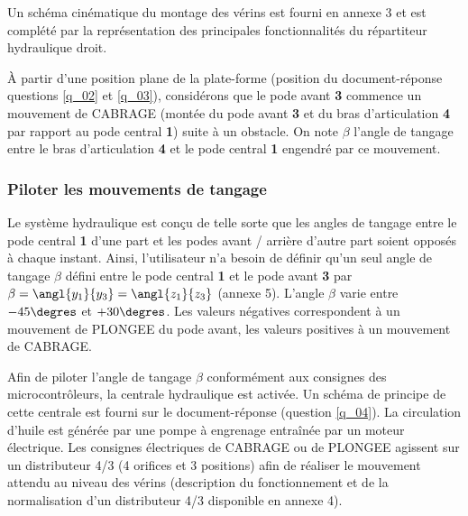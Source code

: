 Un schéma cinématique du montage des vérins est fourni en annexe 3 et est complété par la représentation des
principales fonctionnalités du répartiteur hydraulique droit.


\ifprof
\begin{corrige}
\end{corrige}
\else
\fi


À partir d’une position plane de la plate-forme (position du document-réponse questions \ref{q_02} et \ref{q_03}), considérons que le pode avant \textbf{3} commence un mouvement de CABRAGE (montée du pode avant \textbf{3} et du bras d’articulation \textbf{4} par rapport au pode central \textbf{1}) suite à un obstacle. On note $\beta$ l’angle de tangage entre le bras d’articulation \textbf{4} et le pode central \textbf{1} engendré par ce mouvement.

\ifprof
\begin{corrige}
\end{corrige}
\else
\fi


\subsubsection{Piloter les mouvements de tangage}
Le système hydraulique est conçu de telle sorte que les angles de tangage entre le pode central \textbf{1} d’une part et les
podes avant / arrière d’autre part soient opposés à chaque instant. Ainsi, l’utilisateur n’a besoin de définir qu’un seul
angle de tangage $\beta$ défini entre le pode central \textbf{1} et le pode avant \textbf{3} par $\beta=\angl{y_1}{y_3}=\angl{z_1}{z_3}$ (annexe 5). L’angle
$\beta$
varie entre $- 45\degres$ et $+30\degres$. Les valeurs négatives correspondent à un mouvement de PLONGEE du pode avant, les
valeurs positives à un mouvement de CABRAGE.

Afin de piloter l’angle de tangage $\beta$ conformément aux consignes des microcontrôleurs, la centrale hydraulique est activée. Un schéma de principe de cette centrale est fourni sur le document-réponse (question \ref{q_04}). La circulation d’huile est générée par une pompe à engrenage entraînée par un moteur électrique. Les consignes électriques de CABRAGE ou de PLONGEE agissent sur un distributeur 4/3 (4 orifices et 3 positions) afin de réaliser le mouvement attendu au niveau des vérins (description du fonctionnement et de la normalisation d’un distributeur 4/3 disponible en annexe 4).

